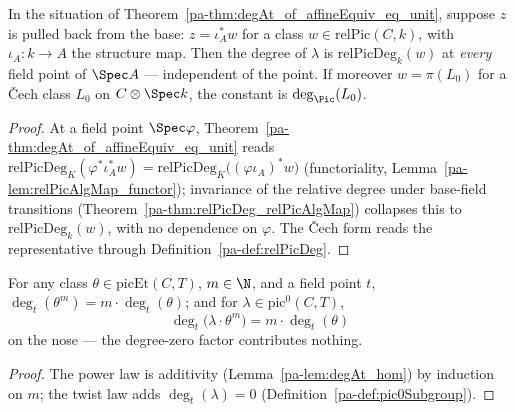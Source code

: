 \begin{theorem}
  \label{pa-thm:degAt_baseChange}
  \leanok

  In the situation of Theorem~\ref{pa-thm:degAt_of_affineEquiv_eq_unit}, suppose \(z\) is pulled
  back from the base: \(z = \iota_A^{*} w\) for a class \(w \in \mathrm{relPic}(C,k)\), with
  \(\iota_A \colon k \to A\) the structure map. Then the degree of \(\lambda\) is
  \(\mathrm{relPicDeg}_k(w)\) at \emph{every} field point of \(\Spec A\) — independent of the
  point. If moreover \(w = \pi(L_0)\) for a \v Cech class \(L_0\) on \(C \otimes \Spec k\),
  the constant is \(\deg_{\Pic}(L_0)\).
\end{theorem}
\begin{proof}
  \leanok
  At a field point \(\Spec\varphi\), Theorem~\ref{pa-thm:degAt_of_affineEquiv_eq_unit} reads
  \(\mathrm{relPicDeg}_K(\varphi^{*}\iota_A^{*}w) =
  \mathrm{relPicDeg}_K\bigl((\varphi\iota_A)^{*}w\bigr)\) (functoriality,
  Lemma~\ref{pa-lem:relPicAlgMap_functor}); invariance of the relative degree under base-field
  transitions (Theorem~\ref{pa-thm:relPicDeg_relPicAlgMap}) collapses this to
  \(\mathrm{relPicDeg}_k(w)\), with no dependence on \(\varphi\). The \v Cech form reads the
  representative through Definition~\ref{pa-def:relPicDeg}.
\end{proof}

\begin{theorem}
  \label{pa-thm:degAt_pic0_mul_pow}
  \leanok

  For any class \(\theta \in \mathrm{picEt}(C,T)\), \(m \in \N\), and a field point \(t\),
  \(\deg_t(\theta^m) = m \cdot \deg_t(\theta)\); and for
  \(\lambda \in \mathrm{pic}^0(C,T)\),
  \[
    \deg_t\bigl(\lambda \cdot \theta^{m}\bigr) = m \cdot \deg_t(\theta)
  \]
  on the nose — the degree-zero factor contributes nothing.
\end{theorem}
\begin{proof}
  \leanok
  The power law is additivity (Lemma~\ref{pa-lem:degAt_hom}) by induction on \(m\); the twist
  law adds \(\deg_t(\lambda) = 0\) (Definition~\ref{pa-def:pic0Subgroup}).
\end{proof}

